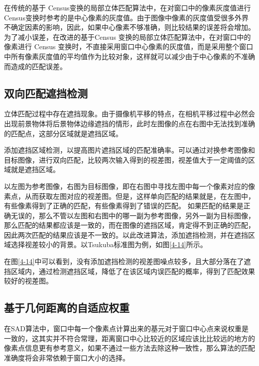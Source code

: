 在传统的基于 Census变换的局部立体匹配算法中，在对窗口中的像素灰度值进行 Census变换时参考的是中心像素的灰度值。由于图像中像素的灰度值受很多外界不确定因素的影响，因此，如果中心像素不够准确，则比较结果的误差将会增加。为了减小误差，在改进的基于Census 变换的局部立体匹配算法中，在对窗口中的像素进行 Census 变换时，不直接采用窗口中心像素的灰度值，而是采用整个窗口中所有像素灰度值的平均值作为比较对象，这样就可以减少由于中心像素的不准确而造成的匹配误差。 

\subsection{双向匹配遮挡检测}

立体匹配过程中存在遮挡现象。由于摄像机平移的特点，在相机平移过程中必然会出现前景物体将后景物体边缘遮挡的情形，此时左图像的点在右图中无法找到准确的匹配点，这部分区域就是遮挡区域。


添加遮挡区域检测，以提高图片遮挡区域的匹配准确率。可以通过对换参考图像和目标图像，进行双向匹配，比较两次输入得到的视差图，视差值大于一定阈值的区域就是遮挡区域。

以左图为参考图像，右图为目标图像，即在右图中寻找左图中每一个像素对应的像素点，从而获取左图对应的视差图。但是，这样单向匹配的结果就是，在左图中，有些像素得到了正确的匹配，有些像素得到了错误的匹配。 如果匹配的结果是正确无误的，那么不管以左图和右图中的哪一副为参考图像，另外一副为目标图像，那么匹配的结果都应该是一致的，而在图像的遮挡区域，肯定得不到正确的匹配，因此两次匹配的结果应该是不一致的。以此改进算法，添加遮挡检测，并在遮挡区域选择视差较小的背景。以Tsukuba标准图为例，如图\ref{4-14}所示。


在图\ref{4-14}中可以看到，没有添加遮挡检测的视差图噪点较多，且大部分落在了遮挡区域内，通过检测遮挡区域，降低了在该区域内误匹配的概率，得到了匹配效果较好的视差图。

\subsection{基于几何距离的自适应权重}

在SAD算法中，窗口中每一个像素点计算出来的基元对于窗口中心点来说权重是一致的，这其实并不符合常理，距离窗口中心比较近的区域应该比比较远的地方的像素点信息更有参考意义，如果不通过一些方法去除这种一致性，那么算法的匹配准确度将会非常依赖于窗口大小的选择。

